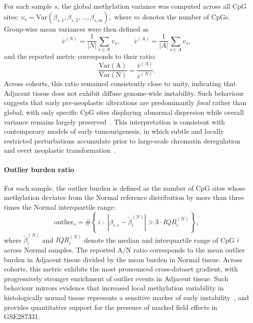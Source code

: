 For each sample $s$, the global methylation variance was computed across all CpG sites:
$
v_s = \mathrm{Var}\!\left(\beta_{s,1}, \beta_{s,2}, \ldots, \beta_{s,m}\right),
$
where $m$ denotes the number of CpGs. Group-wise mean variances were then defined as
\begin{equation}
\overline{v}^{(N)} = \frac{1}{|N|} \sum_{s \in N} v_s,
\qquad
\overline{v}^{(A)} = \frac{1}{|A|} \sum_{s \in A} v_s,
\label{eq:group_mean_variance}
\end{equation}
and the reported metric corresponds to their ratio:
\begin{equation}
\mathrm{\frac{Var(A)}{Var(N)}} = 
\frac{\overline{v}^{(A)}}{\overline{v}^{(N)}}.
\label{eq:variance_ratio}
\end{equation}
Across cohorts, this ratio remained consistently close to unity, indicating that Adjacent tissue does not exhibit diffuse genome-wide instability.  
Such behaviour suggests that early pre-neoplastic alterations are predominantly \emph{focal} rather than global, with only specific CpG sites displaying abnormal dispersion while overall variance remains largely preserved~\cite{Yates2024_NormalMucosaField}.  
This interpretation is consistent with contemporary models of early tumourigenesis, in which subtle and locally restricted perturbations accumulate prior to large-scale chromatin deregulation and overt neoplastic transformation~\cite{Zhang2024_TumorInitiationEpigenetic}.


\paragraph{Outlier burden ratio}  
For each sample, the outlier burden is defined as the number of CpG sites whose methylation 
deviates from the Normal reference distribution by more than three times the Normal 
interquartile range:
\begin{equation}
\text{outlier}_s = 
\#\left\{\, i \;:\; 
\left| \beta_{i,s} - \tilde{\beta}^{(N)}_i \right| 
> 3 \cdot IQR^{(N)}_i \,\right\},
\label{eq:outlier_burden}
\end{equation}
where $\tilde{\beta}^{(N)}_i$ and $IQR^{(N)}_i$ denote the median and interquartile range of CpG $i$ 
across Normal samples.  
The reported A/N ratio corresponds to the mean outlier burden in Adjacent tissue divided by the 
mean burden in Normal tissue. Across cohorts, this metric exhibits the most pronounced cross-dataset gradient, with progressively stronger enrichment of outlier events in Adjacent tissue.  
Such behaviour mirrors evidence that increased local methylation variability in histologically normal tissue represents a sensitive marker of early instability~\cite{Yates2024_NormalMucosaField}, and provides quantitative support for the presence of marked field effects in GSE287331.

